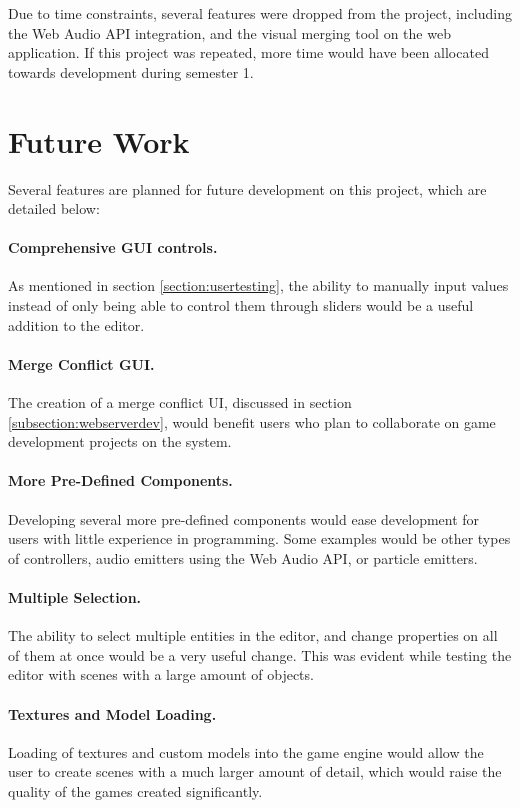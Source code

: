 Due to time constraints, several features were dropped from the project, including the Web Audio API integration, and the visual merging tool on the web application. If this project was repeated, more time would have been allocated towards development during semester 1.

\section{Future Work}
\label{section:futurework}
Several features are planned for future development on this project, which are detailed below:

\paragraph{Comprehensive GUI controls.}
As mentioned in section \ref{section:usertesting}, the ability to manually input values instead of only being able to control them through sliders would be a useful addition to the editor.

\paragraph{Merge Conflict GUI.}
The creation of a merge conflict UI, discussed in section \ref{subsection:webserverdev}, would benefit users who plan to collaborate on game development projects on the system.

\paragraph{More Pre-Defined Components.}
Developing several more pre-defined components would ease development for users with little experience in programming. Some examples would be other types of controllers, audio emitters using the Web Audio API, or particle emitters.

\paragraph{Multiple Selection.}
The ability to select multiple entities in the editor, and change properties on all of them at once would be a very useful change. This was evident while testing the editor with scenes with a large amount of objects.

\paragraph{Textures and Model Loading.}
Loading of textures and custom models into the game engine would allow the user to create scenes with a much larger amount of detail, which would raise the quality of the games created significantly.

